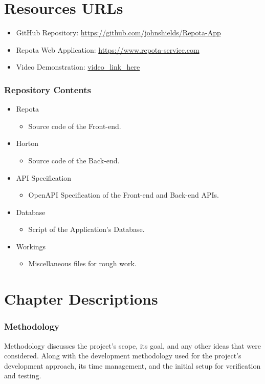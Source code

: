 \newpage
\section{Resources URLs}
\begin{itemize}
    \item GitHub Repository: 
    \url{https://github.com/johnshields/Repota-App}
    \item Repota Web Application: 
    \url{https://www.repota-service.com}
    \item Video Demonstration: 
    \url{video_link_here}
\end{itemize}

\subsubsection{Repository Contents}
\begin{itemize}
  \item Repota
    \begin{itemize}
    \item Source code of the Front-end.
    \end{itemize}
  \item Horton
    \begin{itemize}
    \item Source code of the Back-end.
    \end{itemize}
  \item API Specification
    \begin{itemize}
    \item OpenAPI Specification of the Front-end and Back-end APIs.
    \end{itemize}
  \item Database
    \begin{itemize}
    \item Script of the Application's Database.
    \end{itemize}
  \item Workings
    \begin{itemize}
    \item Miscellaneous files for rough work. 
    \end{itemize}
\end{itemize}

\newpage
\section{Chapter Descriptions}
\subsubsection{Methodology}
Methodology discusses the project's scope, its goal, and any other ideas that were considered. Along with the development methodology used for the project's development approach, its time management, and the initial setup for verification and testing.

